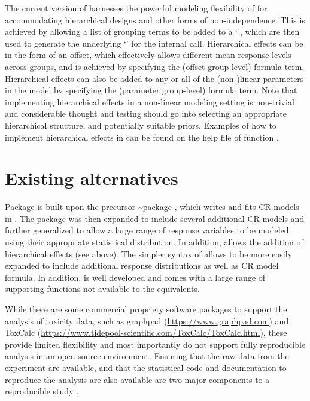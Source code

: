 \documentclass[
  shortnames]{jss}
\newcommand{\cls}[1]{`\code{#1}'}
\begin{document}
The current version of  harnesses the powerful modeling flexibility of  for accommodating hierarchical designs and other forms of non-independence. This is achieved by allowing a list of grouping terms to be added to a \cls{bayesnecformula}, which are then used to generate the underlying \cls{brmsformula} for the  internal call. Hierarchical effects can be in the form of an offset, which effectively allows different mean response levels across groups, and is achieved by specifying the  (offset group-level) formula term. Hierarchical effects can also be added to any or all of the (non-)linear parameters in the model by specifying the  (parameter group-level) formula term. Note that implementing hierarchical effects in a non-linear modeling setting is non-trivial and considerable thought and testing should go into selecting an appropriate hierarchical structure, and potentially suitable priors. Examples of how to implement hierarchical effects in  can be found on the help file of function .

\section[Existing alternatives]{Existing alternatives}\label{bnchmrk}

Package  is built upon the precursor \textasciitilde package  \citep{fisher2020}, which writes and fits CR models in  \citep{Plummer2003}. The  package was then expanded to include several additional CR models and further generalized to allow a large range of response variables to be modeled using their appropriate statistical distribution. In addition,  allows the addition of hierarchical effects (see above). The simpler syntax of  allows  to be more easily expanded to include additional response distributions as well as CR model formula. In addition,  is well developed and comes with a large range of supporting functions not available to the  equivalents.

While there are some commercial propriety software packages to support the analysis of toxicity data, such as graphpad (\url{https://www.graphpad.com}) and ToxCalc (\url{https://www.tidepool-scientific.com/ToxCalc/ToxCalc.html}), these provide limited flexibility and most importantly do not support fully reproducible analysis in an open-source environment. Ensuring that the raw data from the experiment are available, and that the statistical code and documentation to reproduce the analysis are also available are two major components to a reproducible study \citep{peng2015}.
\end{document}
